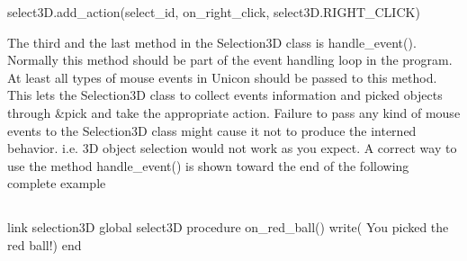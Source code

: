 \documentclass[letterpaper]{article}
\begin{document}
{\bigskip

{\sffamily
select3D.add\_action(select\_id, on\_right\_click, select3D.RIGHT\_CLICK)~~ \newline
}

The third and the last method in the Selection3D class is
\textsf{handle\_event()}. Normally this method should be part
of the event handling loop in the program. At least all types of mouse
events in Unicon should be passed to this method. This lets the
\textsf{Selection3D} class to collect events information and picked
objects through \textsf{\&pick} and take the appropriate
action. Failure to pass any kind of mouse events to the
\textsf{Selection3D} class might cause it not to produce the interned
behavior. i.e. 3D object selection would not work as you expect. A
correct way to use the method \textsf{handle\_event()} is
shown toward the end of the following complete example

\subsection[]{\color{black} }
{\sffamily
link selection3D\newline
global select3D\newline
procedure on\_red\_ball()\newline
 write({\textquotedbl} You picked the red ball!{\textquotedbl}) \newline
end}

}
\end{document}
